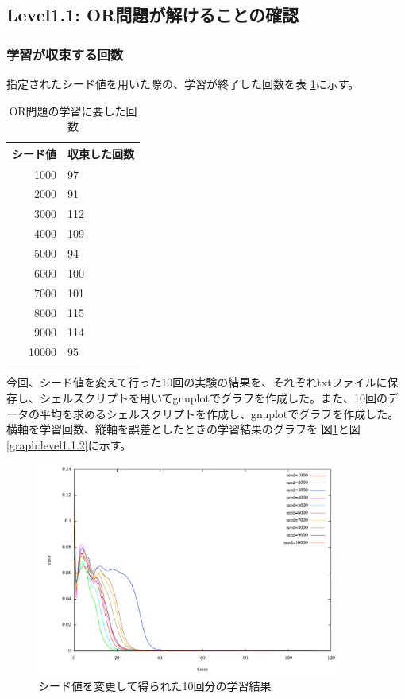 \subsection{Level1.1: OR問題が解けることの確認}
\subsubsection{学習が収束する回数}
指定されたシード値を用いた際の、学習が終了した回数を表
\ref{table:level1.1}に示す。

\begin{table}[htb]
\begin{center}
\caption{OR問題の学習に要した回数}
\label{table:level1.1}
\begin{tabular}[htb]{r|l} \hline
シード値 & 収束した回数 \\ \hline \hline
1000 & 97 \\ \hline
2000 & 91 \\ \hline
3000 & 112 \\ \hline
4000 & 109 \\ \hline
5000 & 94 \\ \hline
6000 & 100 \\ \hline
7000 & 101 \\ \hline
8000 & 115 \\ \hline
9000 & 114 \\ \hline
10000 & 95 \\ \hline
\end{tabular}
\end{center}
\end{table}

今回、シード値を変えて行った10回の実験の結果を、それぞれtxtファイルに保存し、シェルスクリプトを用いてgnuplotでグラフを作成した。また、10回のデータの平均を求めるシェルスクリプトを作成し、gnuplotでグラフを作成した。横軸を学習回数、縦軸を誤差としたときの学習結果のグラフを
図\ref{graph:level1.1.1}と図\ref{graph:level1.1.2}に示す。

\begin{figure}[h]
\begin{center}
\includegraphics[width=10.0cm]{level1/ex.pdf}
\caption{シード値を変更して得られた10回分の学習結果}
\label{graph:level1.1.1}
\end{center}
\end{figure}


